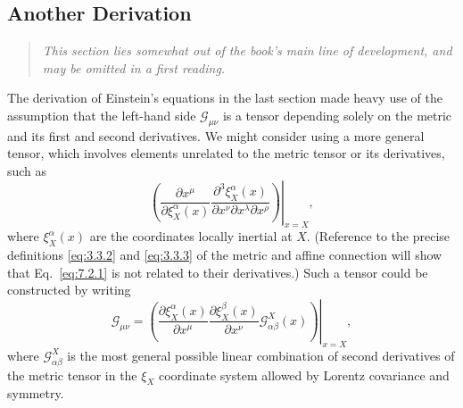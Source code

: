 
\subsection{Another Derivation\optionalreading}\label{sec:7.2}

\begin{quote}
\small\itshape
This section lies somewhat out of the book's main line of development, and
may be omitted in a first reading.
\end{quote}

The derivation of Einstein's equations in the last section made heavy use of
the assumption that the left-hand side \(\mathcal G_{\mu\nu}\) is a tensor
depending solely on the metric and its first and second derivatives. We might
consider using a more general tensor, which involves elements unrelated to the
metric tensor or its derivatives, such as
\begin{equation}
  \left.
  \left(
    \frac{\partial x^\mu}{\partial\xi_X^\alpha(x)}
    \frac{\partial^3\xi_X^\alpha(x)}
         {\partial x^\nu\partial x^\lambda\partial x^\rho}
  \right)
  \right|_{x=X},
  \tag{7.2.1}\label{eq:7.2.1}
\end{equation}
where \(\xi_X^\alpha(x)\) are the coordinates locally inertial at \(X\).
(Reference to the precise definitions \eqref{eq:3.3.2} and
\eqref{eq:3.3.3} of the metric and affine connection will show that
Eq.~\eqref{eq:7.2.1} is not related to their derivatives.) Such a tensor
could be constructed by writing
\begin{equation}
  \mathcal G_{\mu\nu}
  =
  \left.
  \left(
    \frac{\partial\xi_X^\alpha(x)}{\partial x^\mu}
    \frac{\partial\xi_X^\beta(x)}{\partial x^\nu}
    \mathcal G^X_{\alpha\beta}(x)
  \right)
  \right|_{x=X},
  \tag{7.2.2}\label{eq:7.2.2}
\end{equation}
where \(\mathcal G^X_{\alpha\beta}\) is the most general possible linear
combination of second derivatives of the metric tensor in the \(\xi_X\)
coordinate system allowed by Lorentz covariance and symmetry.

